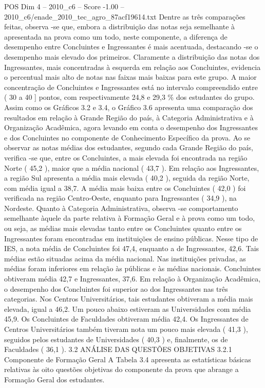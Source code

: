 \begin{textsample}{POS Dim 4 – 2010\_c6 – Score -1.00 – 2010\_c6/enade\_2010\_tec\_agro\_87acf19614.txt}
Dentre as três comparações feitas, observa -se que, embora a distribuição das notas seja semelhante à apresentada na prova como um todo, neste componente, a diferença de desempenho entre Concluintes e Ingressantes é mais acentuada, destacando -se o desempenho mais elevado dos primeiros.
Claramente a distribuição das notas dos Ingressantes, mais concentradas à esquerda em relação aos Concluintes, evidencia o percentual mais alto de notas nas faixas mais baixas para este grupo.
A maior concentração de Concluintes e Ingressantes está no intervalo compreendido entre ( 30 a 40 ] pontos, com respectivamente 24,8 e 29,3 \% dos estudantes do grupo.
Assim como os Gráficos 3.2 e 3.4, o Gráfico 3.6 apresenta uma comparação dos resultados em relação à Grande Região do país, à Categoria Administrativa e à Organização Acadêmica, agora levando em conta o desempenho dos Ingressantes e dos Concluintes no componente de Conhecimento Específico da prova.
Ao se observar as notas médias dos estudantes, segundo cada Grande Região do país, verifica -se que, entre os Concluintes, a mais elevada foi encontrada na região Norte ( 45,2 ), maior que a média nacional ( 43,7 ).
Em relação aos Ingressantes, a região Sul apresenta a média mais elevada ( 40,2 ), seguida da região Norte, com média igual a 38,7.
A média mais baixa entre os Concluintes ( 42,0 ) foi verificada na região Centro-Oeste, enquanto para Ingressantes ( 34,9 ), na Nordeste.
Quanto à Categoria Administrativa, observa -se comportamento semelhante àquele da parte relativa à Formação Geral e à prova como um todo, ou seja, as médias mais elevadas tanto entre os Concluintes quanto entre os Ingressantes foram encontradas em instituições de ensino públicas.
Nesse tipo de IES, a nota média de Concluintes foi 47,4, enquanto a de Ingressantes, 42,6.
Tais médias estão situadas acima da média nacional.
Nas instituições privadas, as médias foram inferiores em relação às públicas e às médias nacionais.
Concluintes obtiveram média 42,7 e Ingressantes, 37,6.
Em relação à Organização Acadêmica, o desempenho dos Concluintes foi superior ao dos Ingressantes nas três categorias.
Nos Centros Universitários, tais estudantes obtiveram a média mais elevada, igual a 46,2.
Um pouco abaixo estiveram as Universidades com média 45,9.
Os Concluintes de Faculdades obtiveram média 42,4.
Os Ingressantes de Centros Universitários também tiveram nota um pouco mais elevada ( 41,3 ), seguidos pelos estudantes de Universidades ( 40,3 ) e, finalmente, os de Faculdades ( 36,1 ). 3.2 ANÁLISE DAS QUESTÕES OBJETIVAS 3.2.1 Componente de Formação Geral A Tabela 3.4 apresenta as estatísticas básicas relativas às oito questões objetivas do componente da prova que abrange a Formação Geral dos estudantes.

\end{textsample}
